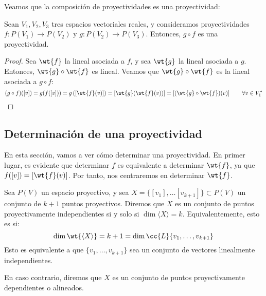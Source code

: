 Veamos que la composición de proyectividades es una proyectividad:
\begin{prop}
    Sean $V_1,V_2,V_3$ tres espacios vectoriales reales, y consideramos proyectividades
    $f:P(V_1)\to P(V_2)$ y $g:P(V_2)\to P(V_3)$. Entonces, $g\circ f$ es una proyectividad.
\end{prop}
\begin{proof}
    Sea $\wt{f}$ la lineal asociada a $f$, y sea $\wt{g}$ la lineal asociada a $g$.
    Entonces, $\wt{g}\circ \wt{f}$ es lineal. Veamos que $\wt{g}\circ \wt{f}$ es la
    lineal asociada a $g\circ f$:
    \begin{equation*}
        (g\circ f)([v]) = g(f([v])) = g\left(\left[\wt{f}(v)\right]\right)
        = \left[\wt{g}(\wt{f}(v))\right] = \left[(\wt{g}\circ \wt{f})(v)\right] \qquad \forall v\in V_1^\ast
    \end{equation*}
\end{proof}

\subsection{Determinación de una proyectividad}

En esta sección, vamos a ver cómo determinar una proyectividad.
En primer lugar, es evidente que determinar $f$ es equivalente a determinar $\wt{f}$, ya que $f([v])=\left[\wt{f}(v)\right]$. Por tanto, nos centraremos en determinar $\wt{f}$.

\begin{definicion}
    Sea $P(V)$ un espacio proyectivo, y sea $X=\{[v_1],\dots [v_{k+1}]\}\subset P(V)$ un conjunto de $k+1$ puntos proyectivos.
    Diremos que $X$ es un conjunto de puntos proyectivamente independientes si y solo si $\dim \langle X \rangle = k$. Equivalentemente, esto es si:
    \begin{equation*}
        \dim \wt{\langle X \rangle} = k +1 = \dim \cc{L}\{v_1,\dots,v_{k+1}\}
    \end{equation*}
    Esto es equivalente a que $\{v_1,\dots,v_{k+1}\}$ sea un conjunto de vectores linealmente independientes.

    En caso contrario, diremos que $X$ es un conjunto de puntos proyectivamente dependientes o alineados.    
\end{definicion}


